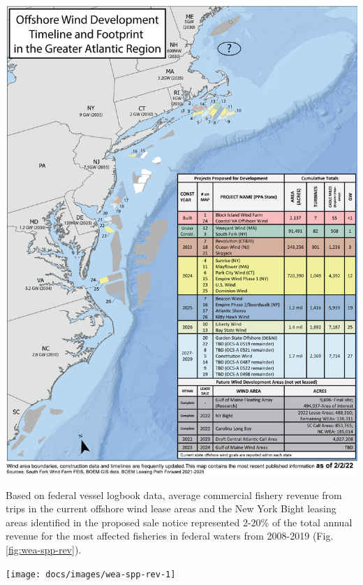 \documentclass[
  10pt,
]{article}
\let\origfigure\figure
\let\endorigfigure\endfigure
\renewenvironment{figure}[1][2] {
    \expandafter\origfigure\expandafter[H]
} {
    \endorigfigure
}
\begin{document}
\begin{figure}

{\centering \includegraphics[width=0.9\linewidth]{images/offshore_wind_timeline} 

}

\caption{All Northeast Project areas by year construction ends (each project has 2 year construction period).}\label{fig:wind-dev-cumul}
\end{figure}

Based on federal vessel logbook data, average commercial fishery revenue
from trips in the current offshore wind lease areas and the New York
Bight leasing areas identified in the proposed sale notice represented
2-20\% of the total annual revenue for the most affected fisheries in
federal waters from 2008-2019 (Fig. \ref{fig:wea-spp-rev}).

\begin{figure}

{\centering \texttt{[image: docs/images/wea-spp-rev-1]} 

}

\caption{Wind energy revenue in the Mid-Atlantic.}\label{fig:wea-spp-rev}
\end{figure}
\end{document}
